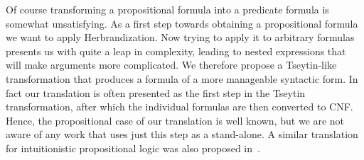 \documentclass[runningheads]{llncs}
\begin{document}
Of course transforming a propositional formula into a predicate formula is somewhat unsatisfying. As a first step towards obtaining a propositional formula we want to apply Herbrandization. Now trying to apply it to arbitrary formulas presents us with quite a leap in complexity, leading to nested expressions that will make arguments more complicated. We therefore propose a Tseytin-like transformation that produces a formula of a more manageable syntactic form. In fact our translation is often presented as the first step in the Tseytin transformation, after which the individual formulas are then converted to CNF.
Hence, the propositional case of our translation is well known, but we are not aware of any work that uses just this step as a stand-alone. A similar translation for intuitionistic propositional logic was also proposed in~\cite{statman1979intuitionistic}.
\end{document}
